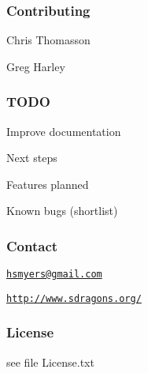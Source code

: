 \subsubsection*{Contributing}


\begin{DoxyItemize}
\item Chris Thomasson
\item Greg Harley
\end{DoxyItemize}

\subsubsection*{T\+O\+DO}


\begin{DoxyItemize}
\item Improve documentation
\item Next steps
\item Features planned
\item Known bugs (shortlist)
\end{DoxyItemize}

\subsubsection*{Contact}


\begin{DoxyItemize}
\item \href{mailto:hsmyers@gmail.com}{\tt hsmyers@gmail.\+com}
\item \href{http://www.sdragons.org/}{\tt http\+://www.\+sdragons.\+org/}
\end{DoxyItemize}

\subsubsection*{License}


\begin{DoxyItemize}
\item see file License.\+txt 
\end{DoxyItemize}